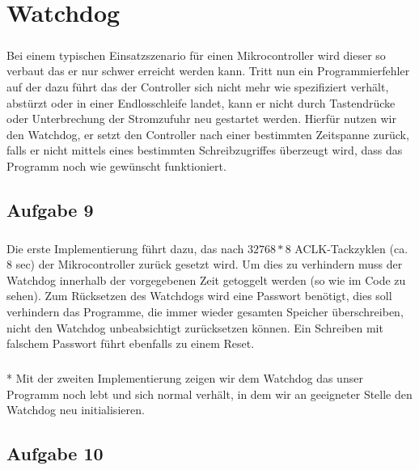 \chapter{Watchdog}

\paragraph*{}
Bei einem typischen Einsatzszenario für einen Mikrocontroller wird dieser so verbaut das er nur schwer erreicht werden kann. Tritt nun ein Programmierfehler auf der dazu führt das der Controller sich nicht mehr wie spezifiziert verhält, abstürzt oder in einer Endlosschleife landet, kann er nicht durch Tastendrücke oder Unterbrechung der Stromzufuhr neu gestartet werden. Hierfür nutzen wir den Watchdog, er setzt den Controller nach einer bestimmten Zeitspanne zurück, falls er nicht mittels eines bestimmten Schreibzugriffes überzeugt wird, dass das Programm noch wie gewünscht funktioniert. 

\section*{Aufgabe 9}

\paragraph*{}
Die erste Implementierung führt dazu, das nach $32768 * 8$ ACLK-Tackzyklen (ca. 8 sec) der Mikrocontroller zurück gesetzt wird. Um dies zu verhindern muss der Watchdog innerhalb der vorgegebenen Zeit getoggelt werden (so wie im Code zu sehen). Zum Rücksetzen des Watchdogs wird eine Passwort benötigt, dies soll verhindern das Programme, die immer wieder gesamten Speicher überschreiben, nicht den Watchdog unbeabsichtigt zurücksetzen können. Ein Schreiben mit falschem Passwort führt ebenfalls zu einem Reset. \\



\paragraph{}*
Mit der zweiten Implementierung zeigen wir dem Watchdog das unser Programm noch lebt und sich normal verhält, in dem wir an geeigneter Stelle den Watchdog neu initialisieren.

\section*{Aufgabe 10}

